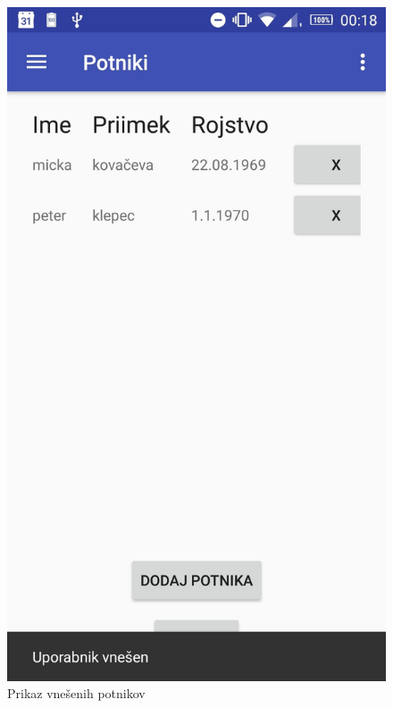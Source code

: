 \documentclass[11pt,a4paper]{article}
\begin{document}
\begin{figure}[htb]
	\centerline{\includegraphics[width=1.0\textwidth]{potnikiScreen.jpg}}
	\caption{Prikaz vnešenih potnikov}
	\label{sl:koncept}
\end{figure}









\end{document}
